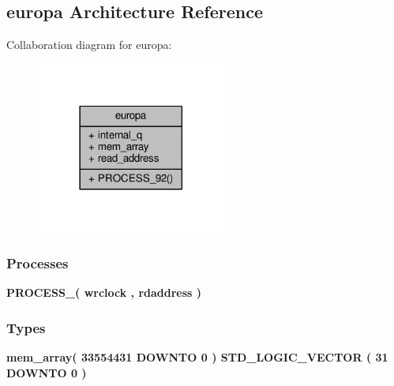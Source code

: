 \subsection{europa Architecture Reference}
\label{classddr2__full__mem__model__ram__module_1_1europa}


Collaboration diagram for europa\+:\nopagebreak
\begin{figure}[H]
\begin{center}
\leavevmode
\includegraphics[width=177pt]{dc/dc6/classddr2__full__mem__model__ram__module_1_1europa__coll__graph}
\end{center}
\end{figure}
\subsubsection*{Processes}
 \begin{DoxyCompactItemize}
\item 
{\bf P\+R\+O\+C\+E\+S\+S\+\_}{\bfseries  ( {\bfseries {\bfseries {\bf wrclock}} \textcolor{vhdlchar}{ }} , {\bfseries {\bfseries {\bf rdaddress}} \textcolor{vhdlchar}{ }} )}
\end{DoxyCompactItemize}
\subsubsection*{Types}
 \begin{DoxyCompactItemize}
\item 
{\bfseries {\bf mem\+\_\+array}{\bfseries \textcolor{vhdlchar}{(}\textcolor{vhdlchar}{ }\textcolor{vhdlchar}{ } \textcolor{vhdldigit}{33554431} \textcolor{vhdlchar}{ }\textcolor{keywordflow}{D\+O\+W\+N\+TO}\textcolor{vhdlchar}{ }\textcolor{vhdlchar}{ } \textcolor{vhdldigit}{0} \textcolor{vhdlchar}{ }\textcolor{vhdlchar}{)}\textcolor{vhdlchar}{ }\textcolor{vhdlchar}{ }\textcolor{comment}{S\+T\+D\+\_\+\+L\+O\+G\+I\+C\+\_\+\+V\+E\+C\+T\+OR}\textcolor{vhdlchar}{ }\textcolor{vhdlchar}{(}\textcolor{vhdlchar}{ }\textcolor{vhdlchar}{ } \textcolor{vhdldigit}{31} \textcolor{vhdlchar}{ }\textcolor{keywordflow}{D\+O\+W\+N\+TO}\textcolor{vhdlchar}{ }\textcolor{vhdlchar}{ } \textcolor{vhdldigit}{0} \textcolor{vhdlchar}{ }\textcolor{vhdlchar}{)}\textcolor{vhdlchar}{ }}} 
\end{DoxyCompactItemize}
